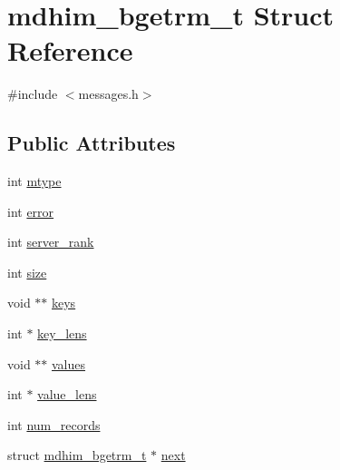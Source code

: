 \hypertarget{structmdhim__bgetrm__t}{\section{mdhim\-\_\-bgetrm\-\_\-t Struct Reference}
\label{d0/d48/structmdhim__bgetrm__t}
}


{\ttfamily \#include $<$messages.\-h$>$}

\subsection*{Public Attributes}
\begin{DoxyCompactItemize}
\item 
int \hyperlink{structmdhim__bgetrm__t_a6d1d78bcd4d55f5341f543246a7636c6}{mtype}
\item 
int \hyperlink{structmdhim__bgetrm__t_a42d5a4b81bd9817f4c31348525d53e37}{error}
\item 
int \hyperlink{structmdhim__bgetrm__t_a3113667adc0eafe85d22c273766bce7f}{server\-\_\-rank}
\item 
int \hyperlink{structmdhim__bgetrm__t_a18bb77da1f9fa807514b7449057157f4}{size}
\item 
void $\ast$$\ast$ \hyperlink{structmdhim__bgetrm__t_adb7029ca1238649fc6b838e21dc1e1fc}{keys}
\item 
int $\ast$ \hyperlink{structmdhim__bgetrm__t_a4edb37ec3da3413607e3eeda3f224525}{key\-\_\-lens}
\item 
void $\ast$$\ast$ \hyperlink{structmdhim__bgetrm__t_a322850d7fda46b0c170ca98342a81779}{values}
\item 
int $\ast$ \hyperlink{structmdhim__bgetrm__t_add99791a3bc82e16120388d1dc0f3ba7}{value\-\_\-lens}
\item 
int \hyperlink{structmdhim__bgetrm__t_a3d398b31f450603e67b854ab563180e8}{num\-\_\-records}
\item 
struct \hyperlink{structmdhim__bgetrm__t}{mdhim\-\_\-bgetrm\-\_\-t} $\ast$ \hyperlink{structmdhim__bgetrm__t_aeb24801d3c8827a0ca7611312e28e568}{next}
\end{DoxyCompactItemize}



